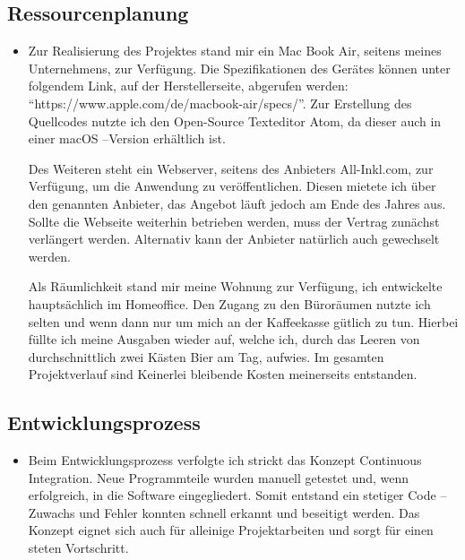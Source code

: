 \subsection{Ressourcenplanung}
\label{sec:Ressourcenplanung}

\begin{itemize}
	\item Zur Realisierung des Projektes stand mir ein Mac Book Air, seitens meines Unternehmens, zur Verfügung. Die Spezifikationen des Gerätes können unter folgendem Link, auf der Herstellerseite, abgerufen werden: “https://www.apple.com/de/macbook-air/specs/”. Zur Erstellung des Quellcodes nutzte ich den Open-Source Texteditor Atom, da dieser auch in einer macOS –Version erhältlich ist. 

Des Weiteren steht ein Webserver, seitens des Anbieters All-Inkl.com, zur Verfügung, um die Anwendung zu veröffentlichen. Diesen mietete ich über den genannten Anbieter, das Angebot läuft jedoch am Ende des Jahres aus. Sollte die Webseite weiterhin betrieben werden, muss der Vertrag zunächst verlängert werden. Alternativ kann der Anbieter natürlich auch gewechselt werden.  

Als Räumlichkeit stand mir meine Wohnung zur Verfügung, ich entwickelte hauptsächlich im Homeoffice. Den Zugang zu den Büroräumen nutzte ich selten und wenn dann nur um mich an der Kaffeekasse gütlich zu tun. Hierbei füllte ich meine Ausgaben wieder auf, welche ich, durch das Leeren von durchschnittlich zwei Kästen Bier am Tag, aufwies. Im gesamten Projektverlauf sind Keinerlei bleibende Kosten meinerseits entstanden. 
\end{itemize}


\subsection{Entwicklungsprozess}
\label{sec:Entwicklungsprozess}
\begin{itemize}
	\item Beim Entwicklungsprozess verfolgte ich strickt das Konzept Continuous Integration. Neue Programmteile wurden manuell getestet und, wenn erfolgreich, in die Software eingegliedert. Somit entstand ein stetiger Code –Zuwachs und Fehler konnten schnell erkannt und beseitigt werden. Das Konzept eignet sich auch für alleinige Projektarbeiten und sorgt für einen steten Vortschritt.
\end{itemize}
